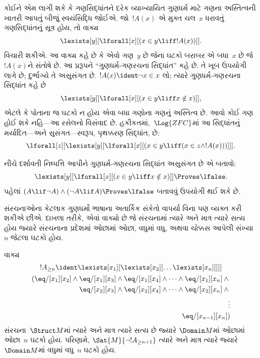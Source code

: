 કોઈને એમ લાગી શકે કે ગણસિદ્ધાંતને દરેક વ્યાખ્યાયિત ગુણધર્મ માટે ગણના
અસ્તિત્વની ખાતરી આપતું બીજું સ્વયંસિદ્ધિ જોઈએ. જો~$!A(x)$ એ મુક્ત
ચલ~$x$ ધરાવતું ગણસિદ્ધાંતનું સૂત્ર હોય, તો વાક્ય
\[
\lexists[y][\lforall[x][(x \in y \liff !A(x))]].
\]
વિચારી શકીએ. આ વાક્ય કહે છે કે એવો ગણ~$y$ છે જેના ઘટકો
બરાબર એ બધા~$x$ છે જે~$!A(x)$ને સંતોષે છે. આ પ્રરૂપને
``ગુણધર્મ-ગણરચના સિદ્ધાંત'' કહે છે. તે ખૂબ ઉપયોગી લાગે છે; દુર્ભાગ્યે
તે અસુસંગત છે. $!A(x)\ident\lnot x\in x$ લો; ત્યારે
ગુણધર્મ-ગણરચના સિદ્ધાંત કહે છે
\[
\lexists[y][\lforall[x][(x \in y \liff x \notin x)]],
\]
એટલે કે પોતાના જ ઘટકો ન હોય એવા બધા ગણોના ગણનું અસ્તિત્વ છે.
આવો કોઈ ગણ હોઈ શકે નહિ---આ રસેલનો વિસંવાદ છે. હકીકતમાં,~$\Log{ZFC}$માં
આ સિદ્ધાંતનું મર્યાદિત---અને સુસંગત---સ્વરૂપ, પૃથક્કરણ સિદ્ધાંત, છે:
\[
\lforall[z][\lexists[y][\lforall[x][(x \in y \liff (x \in z \land
      !A(x)))]]].
\]

\begin{prob}
નીચે દર્શાવતી નિષ્પત્તિ આપીને ગુણધર્મ-ગણરચના સિદ્ધાંત અસુસંગત
છે એ બતાવો:
\[
\lexists[y][\lforall[x][(x \in y \liff x \notin x)]] \Proves \lfalse.
\]
પહેલાં $(A\lif\lnot A)\land(\lnot A\lif A)\Proves\lfalse$ બતાવવું
ઉપયોગી થઈ શકે છે.
\end{prob}
\endgroup


\begingroup
\makeatletter{}\makeatother


\label{guunit:OLP-0173}


\begin{explain}
સંરચનાઓના કેટલાક ગુણધર્મો ભાષાના અતાર્કિક સંકેતો વાપર્યા વિના પણ
વ્યક્ત કરી શકીએ છીએ. દાખલા તરીકે, એવાં વાક્યો છે જે
સંરચનામાં ત્યારે અને માત્ર ત્યારે સત્ય હોય જ્યારે
સંરચનાના પ્રદેશમાં ઓછામાં ઓછા, વધુમાં વધુ, અથવા ચોક્કસ
આપેલી સંખ્યા~$n$ જેટલા ઘટકો હોય.
\end{explain}

\begin{prop}
વાક્ય
\begin{multline*}
  !A_{\ge n} \ident \lexists[x_1][\lexists[x_2][\dots\lexists[x_n][{}]]]\\
  \begin{aligned}
  (\eq/[x_1][x_2] \land {}
  \eq/[x_1][x_3] \land \eq/[x_1][x_4] \land \dots \land \eq/[x_1][x_n] \land {}\\
\eq/[x_2][x_3] \land \eq/[x_2][x_4] \land \dots \land {} \eq/[x_2][x_n] \land {} \\
\vdots\\
\eq/[x_{n-1}][x_n])
\end{aligned}
\end{multline*}
સંરચના~$\Struct M$માં ત્યારે અને માત્ર ત્યારે સત્ય છે જ્યારે
$\Domain M$માં ઓછામાં ઓછા~$n$ ઘટકો હોય. પરિણામે,
$\Sat{M}{\lnot !A_{\ge n+1}}$ ત્યારે અને માત્ર ત્યારે જ્યારે
$\Domain M$માં વધુમાં વધુ~$n$ ઘટકો હોય.

\end{prop}

